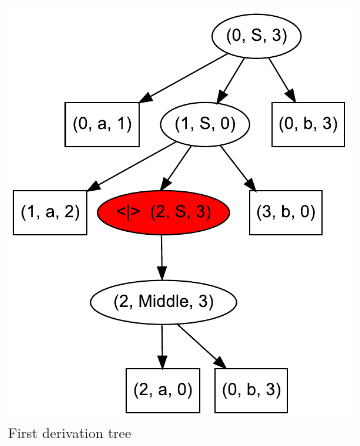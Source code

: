 \begin{figure}[ht]
\begin{center}
\begin{subfigure}[b]{0.3\textwidth}
        \includegraphics[width=\textwidth]{dot/AnBn_2.pdf}
        \caption{First derivation tree}
        \label{tree1}        
    \end{subfigure}
    ~
    \begin{subfigure}[b]{0.3\textwidth}

\end{subfigure}
\end{center}
\end{figure}
